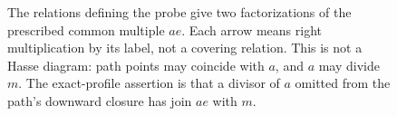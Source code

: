 \begin{figure}[htbp]
\centering
{}
\caption{The relations defining the probe give two factorizations of
the prescribed common multiple $ae$.  Each arrow means right
multiplication by its label, not a covering relation.  This is not a
Hasse diagram: path points may coincide with $a$, and $a$ may divide
$m$.  The exact-profile assertion is that a divisor of $a$ omitted
from the path's downward closure has join $ae$ with $m$.}
\label{fig:probe-divisibility}
\end{figure}
